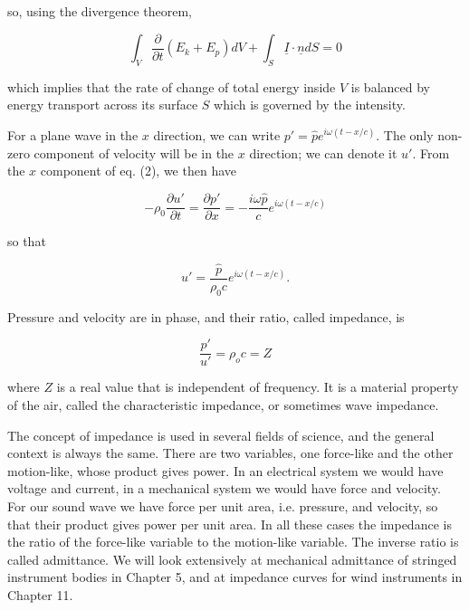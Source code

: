   \noindent{}so, using the divergence theorem, 

  \begin{equation*}\int_V{\dfrac{\partial}{\partial t} (E_k+E_p) dV} + 
  \int_S{\underline{I} \cdot \underline{n} dS}=0 \tag{6}\end{equation*} 

  \noindent{}which implies that the rate of change of total energy inside $V$ 
  is balanced by energy transport across its surface $S$ which is governed by 
  the intensity. 

  For a plane wave in the $x$ direction, we can write $p'=\hat{p} e^{i \omega 
  (t-x/c)}$. The only non-zero component of velocity will be in the $x$ 
  direction; we can denote it $u'$. From the $x$ component of eq. (2), we then 
  have 

  \begin{equation*}-\rho_0 \dfrac{\partial u'}{\partial t} = \dfrac{\partial 
  p'}{\partial x} = -\dfrac{i \omega \hat{p}}{c} e^{i \omega (t-x/c)} 
  \tag{7}\end{equation*} 

  \noindent{}so that 

  \begin{equation*}u' = \dfrac{\hat{p}}{\rho_0 c} e^{i \omega (t-x/c)} . 
  \tag{8}\end{equation*} 

  Pressure and velocity are in phase, and their ratio, called impedance, is 

  \begin{equation*}\frac{p'}{u'} = \rho_o c =Z \tag{9}\end{equation*} 

  \noindent{}where $Z$ is a real value that is independent of frequency. It is 
  a material property of the air, called the characteristic impedance, or 
  sometimes wave impedance. 

  The concept of impedance is used in several fields of science, and the 
  general context is always the same. There are two variables, one force-like 
  and the other motion-like, whose product gives power. In an electrical system 
  we would have voltage and current, in a mechanical system we would have force 
  and velocity. For our sound wave we have force per unit area, i.e. pressure, 
  and velocity, so that their product gives power per unit area. In all these 
  cases the impedance is the ratio of the force-like variable to the 
  motion-like variable. The inverse ratio is called admittance. We will look 
  extensively at mechanical admittance of stringed instrument bodies in Chapter 
  5, and at impedance curves for wind instruments in Chapter 11. 

